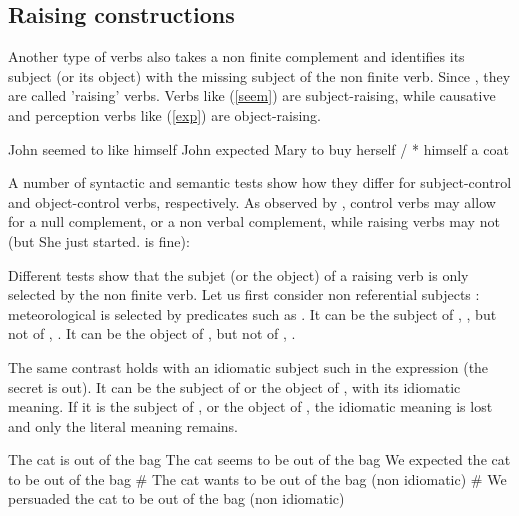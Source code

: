 \documentclass[output=paper]{langsci/langscibook}
\begin{document}
\subsection{Raising constructions}

Another type of verbs also takes a non finite complement and identifies its subject (or its object) with the missing subject of the non finite verb. Since \citet{Postal1974}, they are called 'raising' verbs. Verbs like  (\ref{seem}) are subject-raising, while
causative and perception verbs like  (\ref{exp}) are object-raising.
\begin{exe}
	\ex \begin{xlist}
	\ex John seemed to like himself \label{seem}
\ex  John expected Mary to buy herself / * himself a coat \label{exp}
\end{xlist}
 \end{exe}
 
 A number of syntactic and semantic tests show how they differ for subject-control and object-control verbs, respectively. As observed by \citet{Jacobson1990}, control verbs may allow for a null complement, or a non verbal complement, while raising verbs may not (but She just started. is fine):

\eal
{}
\zl
 
 Different tests show that the subjet (or the object) of a raising verb is only selected by the non
 finite verb. Let us first consider non referential subjects : meteorological  is selected
 by predicates such as . It can be the subject of , , but not of
 , . It can be the object of ,  but not of , .
	
\eal
{}
\zl
\eal
{}
\zl
 	
 The same contrast holds with an idiomatic subject such  in the expression  (the secret is out). It can be the subject of  or the object of , with its idiomatic meaning. If it is the subject of , or the object of , the idiomatic meaning is lost and only the literal meaning remains.
 
 	\begin{exe}
	\ex \begin{xlist}
	\ex The cat is out of the bag
   \ex 	The cat seems to be out of the bag
\ex We expected the cat to be out of the bag
\ex \# The cat wants to be out of the bag (non idiomatic)
\ex 	\# We persuaded the cat to be out of the bag (non idiomatic)
 \end{xlist}
	\end{exe}
\end{document}
